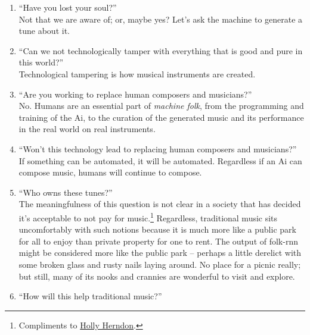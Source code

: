 \documentclass[a4paper,notitlepage,twoside]{book}
\begin{document}
\begin{enumerate}
\item ``Have you lost your soul?'' \\
Not that we are aware of; or, maybe yes?
Let's ask the machine to generate a tune about it.
\item ``Can we not technologically tamper with everything that is good and pure in this world?'' \\
Technological tampering is how musical instruments are created.
\item ``Are you working to replace human composers and musicians?'' \\
No. Humans are an essential part of {\em machine folk},
from the programming and training of the Ai, 
to the curation of the generated music and its performance in the real world
on real instruments.
\item ``Won't this technology lead to replacing human composers and musicians?'' \\
If something can be automated, it will be automated.
Regardless if an Ai can compose music,
humans will continue to compose.
\item ``Who owns these tunes?'' \\
The meaningfulness of this question is not clear in a society that has decided it's acceptable to not pay for music.\footnote{Compliments to \href{https://www.thefader.com/2020/02/25/holly-herndon-ai-generated-travis-scott-song-travisbott-jack-park-canny-dope-man-interview}{Holly Herndon}.}
Regardless, traditional music sits uncomfortably with such notions because it is much more like a public park for all to enjoy than private property for one to rent. The output of folk-rnn might be considered more like the public park – perhaps a little derelict with some broken glass and rusty nails laying around. No place for a picnic really; but still, many of its nooks and crannies are wonderful to visit and explore.
\item ``How will this help traditional music?''\\

\end{enumerate}
\end{document}
